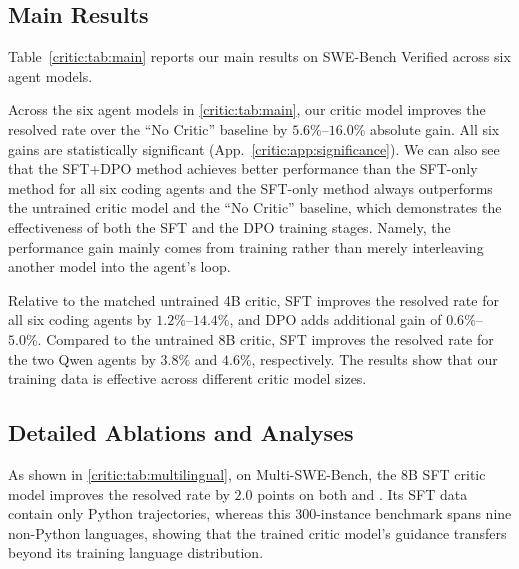 \subsection{Main Results}
\label{critic:sec:main_results}

Table~\ref{critic:tab:main} reports our main results on SWE-Bench Verified across six agent models. 

Across the six agent models in \autoref{critic:tab:main}, our critic model improves the resolved rate over the ``No Critic'' baseline by $5.6\%$--$16.0\%$ absolute gain. All six gains are statistically significant (App.~\ref{critic:app:significance}). 
We can also see that the SFT+DPO method achieves better performance than the SFT-only method for all six coding agents and the SFT-only method always outperforms the untrained critic model and the ``No Critic'' baseline, which demonstrates the effectiveness of both the SFT and the DPO training stages.
Namely, the performance gain mainly comes from training rather than merely interleaving another model into the agent's loop.

Relative to the matched untrained 4B critic, SFT improves the resolved rate for all six coding agents by $1.2\%$--$14.4\%$, and DPO adds additional gain of $0.6\%$--$5.0\%$.
Compared to the untrained 8B critic, SFT improves the resolved rate for the two Qwen agents by $3.8\%$ and $4.6\%$, respectively. 
The results show that our training data is effective across different critic model sizes.




\subsection{Detailed Ablations and Analyses}
\label{critic:sec:detailed_analyses}
As shown in \autoref{critic:tab:multilingual}, on Multi-SWE-Bench, the 8B SFT critic model improves the resolved rate by $2.0$ points on both \criticqwenNext{} and \criticqwenThirtyTwoB{}. Its SFT data contain only Python trajectories, whereas this 300-instance benchmark spans nine non-Python languages, showing that the trained critic model's guidance transfers beyond its training language distribution.


